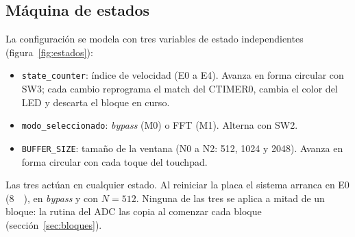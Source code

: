 \documentclass[11pt,a4paper]{article}
\begin{document}
\subsection{Máquina de estados}

La configuración se modela con tres variables de estado independientes
(figura~\ref{fig:estados}):

\begin{itemize}[nosep]
  \item \texttt{state\_counter}: índice de velocidad (E0 a E4). Avanza en
        forma circular con SW3; cada cambio reprograma el match del CTIMER0,
        cambia el color del LED y descarta el bloque en curso.
  \item \texttt{modo\_seleccionado}: \emph{bypass} (M0) o FFT (M1). Alterna
        con SW2.
  \item \texttt{BUFFER\_SIZE}: tamaño de la ventana (N0 a N2: 512, 1024 y
        2048). Avanza en forma circular con cada toque del touchpad.
\end{itemize}

Las tres actúan en cualquier estado. Al reiniciar la placa el sistema
arranca en E0 (\qty{8}{\kilo\sps}), en \emph{bypass} y con $N = 512$. Ninguna
de las tres se aplica a mitad de un bloque: la rutina del ADC las copia al
comenzar cada bloque (sección~\ref{sec:bloques}).
\end{document}
